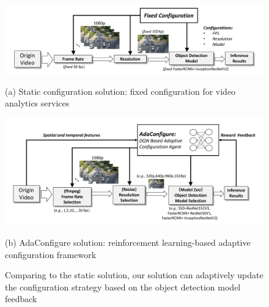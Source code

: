 \begin{figure}[!t]
	\begin{minipage}{\linewidth}
		\centerline{\includegraphics[width=0.8\linewidth]{figures/static_framework.pdf}}
		\begin{center}
			{(a) Static configuration solution: fixed configuration for video analytics services}
		\end{center}
	\end{minipage}
	\vfill
	\vspace{0.4cm}
	\begin{minipage}{\linewidth}
		\centerline{\includegraphics[width=0.8\linewidth]{figures/auto_framework.pdf}}
		\vspace{0.2cm}
		\begin{center}
			{(b) AdaConfigure solution: reinforcement learning-based adaptive configuration framework}
		\end{center}
	\end{minipage}
	\caption{Comparing to the static solution, our solution can adaptively update the configuration strategy based on the object detection model feedback}
	\label{fig: framework}
\end{figure}

